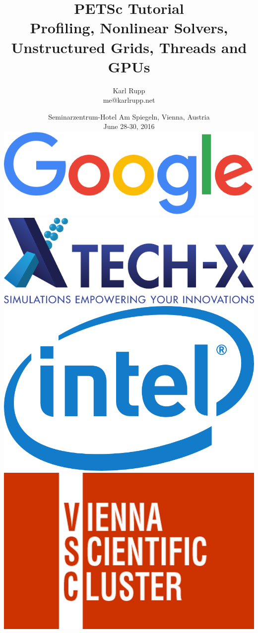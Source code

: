 \documentclass[usepdftitle=false,9pt]{beamer}
\author[Karl Rupp]{Karl Rupp \\ \ttfamily me@karlrupp.net}
\institute[ANL]
{ \footnotesize
  Freelance Computational Scientist \\
}
\title[PETSc]{ { { \Huge PETSc Tutorial } \\ Profiling, Nonlinear Solvers, \\
                                             Unstructured Grids, Threads and GPUs } %
             }
\date[PETSc 2016, June 28-30, 2016]{ \footnotesize Seminarzentrum-Hotel Am Spiegeln, Vienna, Austria \\[1em] June 28-30, 2016 \\[2em]
  \hspace*{-2cm} 
  \includegraphics[height=.9cm]{figures/google} \hspace*{1cm}
  \includegraphics[height=.9cm]{figures/tech-x} \hspace*{1cm}
  \includegraphics[height=.9cm]{figures/intel}  \hspace*{1cm}
  \includegraphics[height=.9cm]{figures/vsc}
  }
\begin{document}
\begin{frame}[plain]
 \frametitle{~}
 \titlepage
\end{frame}


\end{document}
